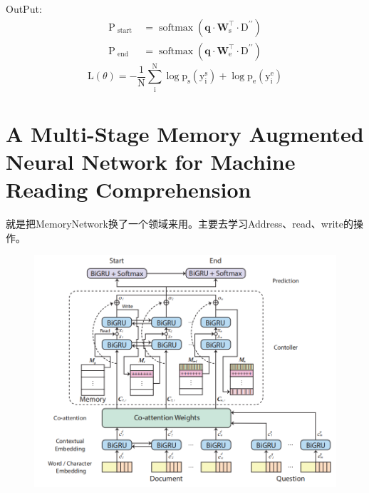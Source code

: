 \documentclass[a4paper,UTF8]{article}
\numberwithin{equation}{section}
\begin{document}
OutPut:
\begin{equation}
\begin{aligned} \mathrm{P}_{\text { start }} &=\operatorname{softmax}\left(\mathbf{q} \cdot \mathbf{W}_{\mathrm{s}}^{\top} \cdot \mathrm{D}^{\prime \prime}\right) \\ \mathrm{P}_{\text { end }} &=\operatorname{softmax}\left(\mathbf{q} \cdot \mathbf{W}_{\mathrm{e}}^{\top} \cdot \mathrm{D}^{\prime \prime}\right) \end{aligned}
\end{equation}
\begin{equation}
	\mathrm{L}(\theta)=-\frac{1}{\mathrm{N}} \sum_{\mathrm{i}}^{\mathrm{N}} \log \mathrm{p}_{\mathrm{s}}\left(\mathrm{y}_{\mathrm{i}}^{\mathrm{s}}\right)+\log \mathrm{p}_{\mathrm{e}}\left(\mathrm{y}_{\mathrm{i}}^{\mathrm{e}}\right)
	\end{equation}
\newpage
\section{A Multi-Stage Memory Augmented Neural Network for Machine Reading Comprehension}
就是把MemoryNetwork换了一个领域来用。主要去学习Address、read、write的操作。
\begin{figure}[H]
	\centering
	\includegraphics[width=\textwidth]{3-1.png}
\end{figure}
\newpage
\end{document}
